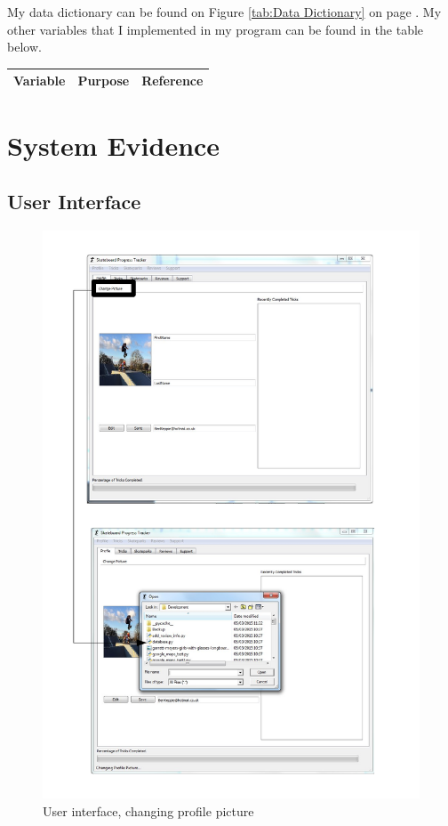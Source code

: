 My data dictionary can be found on Figure \ref{tab:Data Dictionary} on page \pageref{tab:Data Dictionary}. My other variables that I implemented in my program can be found in the table below.

\begin{center}
\begin{tabular}{|p{3.5cm}|p{6cm}|p{3.5cm}|} \hline
\textbf{Variable} & \textbf{Purpose} & \textbf{Reference} \\ \hline

\end{tabular}
\label{tab:Variable List}
\end{center}






\section{System Evidence}

\subsection{User Interface}

\begin{figure}[H]
    \includegraphics[width=\textwidth]{./Maintenance/Figures/ChangePicture.pdf}
    \caption{User interface, changing profile picture} \label{fig:Changing Picture UI}
\end{figure}


